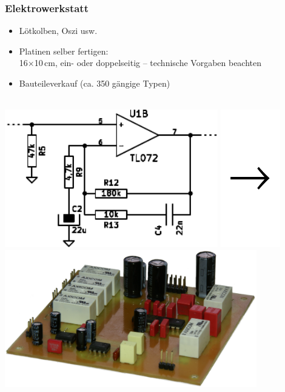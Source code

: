 \documentclass[t]{beamer}
\begin{document}
\begin{frame}
    \frametitle{Elektrowerkstatt}
    \begin{itemize}
        \item Lötkolben, Oszi usw.
        \item Platinen selber fertigen:\\
            16$\times$10\,cm, ein- oder doppelseitig -- technische Vorgaben beachten
        \item Bauteileverkauf (ca. 350 gängige Typen)
    \end{itemize}
        \begin{center}
    ~\\
        \includegraphics[height=6cm]{../img/schaltplan.pdf}
        \includegraphics[height=6cm]{../img/pfeil.pdf}
        \includegraphics[height=6cm]{../img/platine_perspektivisch.png}
    \end{center}
\end{frame}
\end{document}
